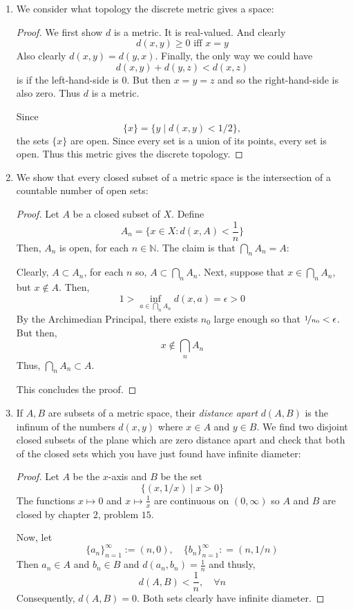 \documentclass{book}
\begin{document}
\begin{enumerate}[(1)]
    \item We consider what topology the discrete metric gives a space: 
        \begin{proof} We first show $d$ is a metric.  It is real-valued. And clearly 
            \[ d(x,y)\geq 0 \text{ iff } x=y\]
            Also clearly $d(x,y)=d(y,x)$.  Finally, the only way we could have 
            \[d(x,y)+d(y,z)<d(x,z)\]
            is if the left-hand-side is $0$. But then $x=y=z$ and so the right-hand-side is also zero.  Thus $d$ is a metric.  \par Since 
            \[\{x\}=\{y\mid d(x,y)<1/2\},\] 
            the sets $\{x\}$ are open. Since every set is a union of its points, every set is open. Thus this metric gives the discrete topology.
        \end{proof}

    \item We show that every closed subset of a metric space is the intersection of a countable number of open sets: 
        \begin{proof} Let $A$ be a closed subset of $X$. Define 
            \[A_n = \{x \in X : d(x,A) < \frac{1}{n} \}\]
            Then, $A_n$ is open, for each $n \in \mathbb{N}$. The claim is that $\bigcap_n A_n = A$: 
            \newline
            \par Clearly, $A \subset A_n$, for each $n$ so, $A \subset \bigcap_n A_n$. Next, suppose that $x \in \bigcap_n A_n$, but $x \notin A$. Then, 
            \[1 > \inf_{a \in \bigcap_n A_n} d(x,a) = \epsilon > 0\]
            By the Archimedian Principal, there exists $n_0$ large enough so that $\nicefrac{1}{n_0} < \epsilon $. But then, 
            \[x \notin \bigcap_n A_n\]
            Thus, $\bigcap_n A_n \subset A$. 
            \par This concludes the proof. 
        \end{proof}

    \item  If $A,B$ are subsets of a metric space, their {\it distance apart} $d(A,B)$ is the infinum of the numbers $d(x,y)$ where $x\in A$ and $y\in B$.  We find two disjoint closed subsets of the plane which are zero distance apart and check that both of the closed sets which you have just found have infinite diameter: 
        \begin{proof} Let  $A$ be the $x$-axis and $B$ be the set 
            \[\{(x,1/x)\mid x>0\}\] 
            The functions $x\mapsto 0$ and $x\mapsto\frac{1}{x}$ are continuous on $(0,\infty)$ so $A$ and $B$ are closed by chapter $2$, problem $15$.  
            \par Now, let 
            \[\{a_n\}_{n=1}^\infty := (n,0), \quad \{b_n\}_{n=1}^\infty : = (n,1/n)\]  
            Then $a_n\in A$ and $b_n\in B$ and $d(a_n,b_n)=\frac{1}{n}$ and thusly, 
            \[ d(A,B)<\frac{1}{n}, \quad \forall n\]
            Consequently, $d(A,B)=0$.  Both sets clearly have infinite diameter.
        \end{proof}


\end{enumerate}
\end{document}
